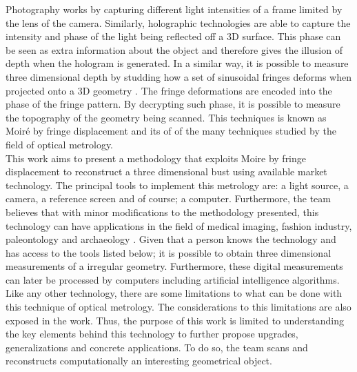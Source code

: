\label{sec:INTRO}

Photography works by capturing different light intensities of a frame limited by the lens of the camera. Similarly, holographic technologies are able to capture the intensity and phase of the light being reflected off a 3D surface. This phase can be seen as extra information about the object and therefore gives the illusion of depth when the hologram is generated. In a similar way, it is possible to measure three dimensional depth by studding how a set of sinusoidal fringes deforms when projected onto a 3D geometry \cite{gaasvik2003optical}. The fringe deformations are encoded into the phase of the fringe pattern. By decrypting such phase, it is possible to measure the topography of the geometry being scanned. This techniques is known as Moiré by fringe displacement and its of of the many techniques studied by the field of optical metrology.  \\

This work aims to present a methodology that exploits Moire by fringe displacement to reconstruct a three dimensional bust using available market technology. The principal tools to implement this metrology are: a light source, a camera, a reference screen and of course; a computer. Furthermore, the team believes that with minor modifications to the methodology presented, this technology can have applications in the field of medical imaging, fashion industry, paleontology and archaeology \cite{Schofield:03}. Given that a person knows the technology and has access to the tools listed below; it is possible to obtain three dimensional measurements of a irregular geometry. Furthermore, these digital measurements can later be processed by computers including artificial intelligence algorithms. \\

Like any other technology, there are some limitations to what can be done with this technique of optical metrology. The considerations to this limitations are also exposed in the work. Thus, the purpose of this work is limited to understanding the key elements behind this technology to further propose upgrades, generalizations and concrete applications. To do so, the team scans and reconstructs computationally an interesting geometrical object. \\
